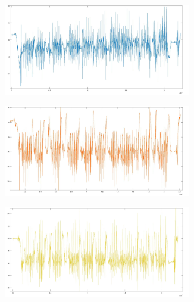 \documentclass[a4paper, oneside]{book}
\begin{document}
\begin{minipage}{\linewidth}
\begin{center}
\includegraphics[width=154mm, height= 40mm]{./images/registrazione_tesi/acc_phX.jpg} 
\end{center}
\end{minipage}

\begin{minipage}{\linewidth}
\begin{center}
\includegraphics[width=154mm, height= 40mm]{./images/registrazione_tesi/acc_phY.jpg} 
\end{center}
\end{minipage}

\begin{minipage}{\linewidth}
\begin{center}
\includegraphics[width=154mm, height= 40mm]{./images/registrazione_tesi/acc_phZ.jpg} 
\end{center}
\end{minipage}
\makebox[\linewidth]{}



\end{document}
